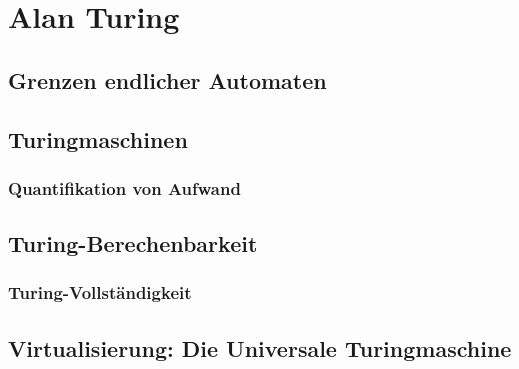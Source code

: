 \chapter{Alan Turing}\label{turing}
\section{Grenzen endlicher Automaten}\label{pumping}
\section{Turingmaschinen}
\subsection{Quantifikation von Aufwand}
\section{Turing-Berechenbarkeit}
\subsection{Turing-Vollständigkeit}\label{turingVollstaendigkeit}
\section{Virtualisierung: Die Universale Turingmaschine}
